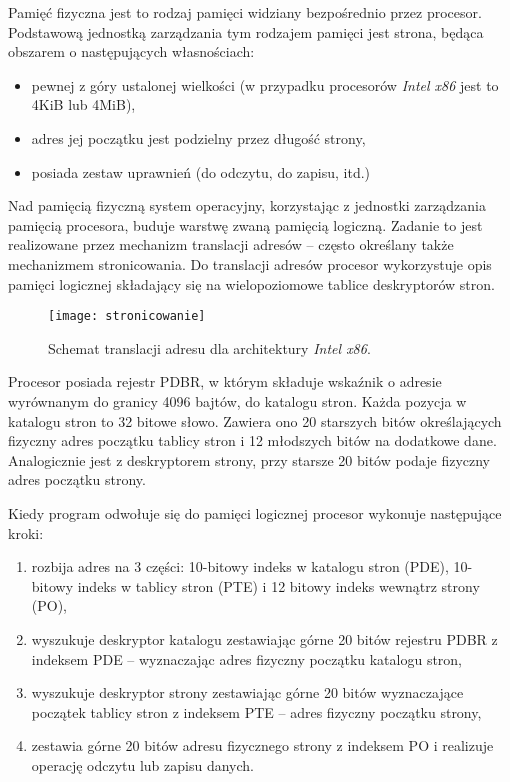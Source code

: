 \documentclass[12pt,a4paper,titlepage,twoside]{mwart}
\begin{document}
Pamięć fizyczna jest to rodzaj pamięci widziany bezpośrednio przez procesor.
Podstawową jednostką zarządzania tym rodzajem pamięci jest strona, będąca
obszarem o następujących własnościach:

\begin{itemize}
\item pewnej z góry ustalonej wielkości (w przypadku procesorów \textit{Intel
x86} jest to 4KiB lub 4MiB),
\item adres jej początku jest podzielny przez długość strony,
\item posiada zestaw uprawnień (do odczytu, do zapisu, itd.)
\end{itemize}

Nad pamięcią fizyczną system operacyjny, korzystając z jednostki zarządzania
pamięcią procesora, buduje warstwę zwaną pamięcią logiczną. Zadanie to jest
realizowane przez mechanizm translacji adresów -- często określany także
mechanizmem stronicowania. Do translacji adresów procesor wykorzystuje opis
pamięci logicznej składający się na wielopoziomowe tablice deskryptorów stron.

\begin{figure}[h]
\centering
\texttt{[image: stronicowanie]}
\caption{Schemat translacji adresu dla architektury \textit{Intel x86}.}
\end{figure}

Procesor posiada rejestr PDBR, w którym składuje wskaźnik o adresie wyrównanym
do granicy 4096 bajtów, do katalogu stron. Każda pozycja w katalogu stron to 32
bitowe słowo. Zawiera ono 20 starszych bitów określających fizyczny adres
początku tablicy stron i 12 młodszych bitów na dodatkowe dane. Analogicznie
jest z deskryptorem strony, przy starsze 20 bitów podaje fizyczny adres
początku strony.

Kiedy program odwołuje się do pamięci logicznej procesor wykonuje następujące kroki:
\begin{enumerate}
\item rozbija adres na 3 części: 10-bitowy indeks w katalogu stron (PDE), 10-bitowy
indeks w tablicy stron (PTE) i 12 bitowy indeks wewnątrz strony (PO),
\item wyszukuje deskryptor katalogu zestawiając górne 20 bitów rejestru PDBR z
indeksem PDE -- wyznaczając adres fizyczny początku katalogu stron,
\item wyszukuje deskryptor strony zestawiając górne 20 bitów wyznaczające
początek tablicy stron z indeksem PTE -- adres fizyczny początku strony,
\item zestawia górne 20 bitów adresu fizycznego strony z indeksem PO i
realizuje operację odczytu lub zapisu danych.
\end{enumerate}
\end{document}

